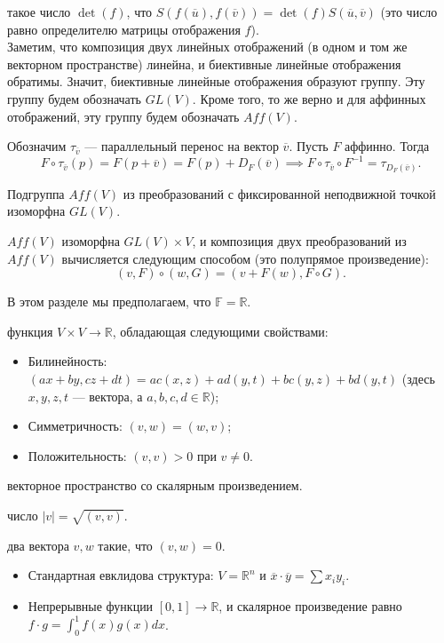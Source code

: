 \documentclass[12pt,a4paper]{article}
\begin{document}
 такое число $\det(f)$, что $S(f(\overline{u}),f(\overline{v}))=\det(f)S(\overline{u},\overline{v})$ (это число равно определителю матрицы отображения $f$).\\

Заметим, что композиция двух линейных отображений (в одном и том же векторном пространстве) линейна, и биективные линейные отображения обратимы. Значит, биективные линейные отображения образуют группу. Эту группу будем обозначать $GL(V)$. Кроме того, то же верно и для аффинных отображений, эту группу будем обозначать $Aff(V)$.

Обозначим $\tau_{\overline{v}}$ --- параллельный перенос на вектор $\overline{v}$. Пусть $F$ аффинно. Тогда \[
	F\circ\tau_{\overline{v}}(p)=F(p+\overline{v})=F(p)+D_F(\overline{v})\implies F\circ \tau_{\overline{v}}\circ F^{-1}=\tau_{D_F(\overline{v})}.
\]

\lemma Подгруппа $Aff(V)$ из преобразований с фиксированной неподвижной точкой изоморфна $GL(V)$.

\lemma $Aff(V)$ изоморфна $GL(V)\times V$, и композиция двух преобразований из $Aff(V)$ вычисляется следующим способом (это полупрямое произведение): \[
	(v,F)\circ (w,G)=(v+F(w),F\circ G).\label{affproduct}
\]

\newpage


В этом разделе мы предполагаем, что $\mathbb F=\mathbb R$.

 функция $V\times V\to \mathbb R$, обладающая следующими свойствами:

\begin{itemize}
	\item Билинейность: $(ax+by,cz+dt)=ac(x,z)+ad(y,t)+bc(y,z)+bd(y,t)$ (здесь $x,y,z,t$ --- вектора, а $a,b,c,d\in \mathbb R$);
	\item Симметричность: $(v,w)=(w,v)$;
	\item Положительность: $(v,v)>0$ при $v\neq 0$.
\end{itemize}

 векторное пространство со скалярным произведением.

 число $|v|=\sqrt{(v,v)}$.

 два вектора $v,w$ такие, что $(v,w)=0$.


\begin{itemize}
	\item Стандартная евклидова структура: $V=\mathbb R^n$ и $\overline{x}\cdot \overline{y}=\sum x_iy_i$.
	\item Непрерывные функции $[0,1]\to \mathbb R$, и скалярное произведение равно $f\cdot g=\int_0^1f(x)g(x)dx$.
\end{itemize}
\end{document}
